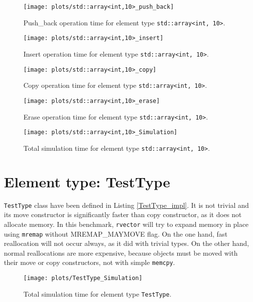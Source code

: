 \documentclass[inz, english, shortabstract]{iithesis}
\begin{document}
\begin{figure}[h!]
\texttt{[image: plots/std::array<int,10>\_push\_back]}
\caption{Push\_back operation time for element type \lstinline{std::array<int, 10>}.}
\label{array_push_back}
\end{figure}

\begin{figure}[h!]
\texttt{[image: plots/std::array<int,10>\_insert]}
\caption{Insert operation time for element type \lstinline{std::array<int, 10>}.}
\label{array_insert}
\end{figure}

\begin{figure}[h!]
\texttt{[image: plots/std::array<int,10>\_copy]}
\caption{Copy operation time for element type \lstinline{std::array<int, 10>}.}
\label{array_copy}
\end{figure}

\begin{figure}[h!]
\texttt{[image: plots/std::array<int,10>\_erase]}
\caption{Erase operation time for element type \lstinline{std::array<int, 10>}.}
\label{array_erase}
\end{figure}

\begin{figure}[h!]
\texttt{[image: plots/std::array<int,10>\_Simulation]}
\caption{Total simulation time for element type \lstinline{std::array<int, 10>}.}
\label{array_simulation}
\end{figure}

\clearpage
\section{Element type: TestType}
{\tt TestType} class have been defined in Listing \ref{TestType_impl}. It is not trivial and its move constructor is significantly faster than copy constructor, as it does not allocate memory. In this benchmark, {\tt rvector} will try to expand memory in place using {\tt mremap} without MREMAP\_MAYMOVE flag. On the one hand, fast reallocation will not occur always, as it did with trivial types. On the other hand, normal reallocations are more expensive, because objects must be moved with their move or copy constructors, not with simple {\tt memcpy}.

\begin{figure}[h!]
\texttt{[image: plots/TestType\_Simulation]}
\caption{Total simulation time for element type \lstinline{TestType}.}
\label{TestType_push_back}
\end{figure}
\end{document}
